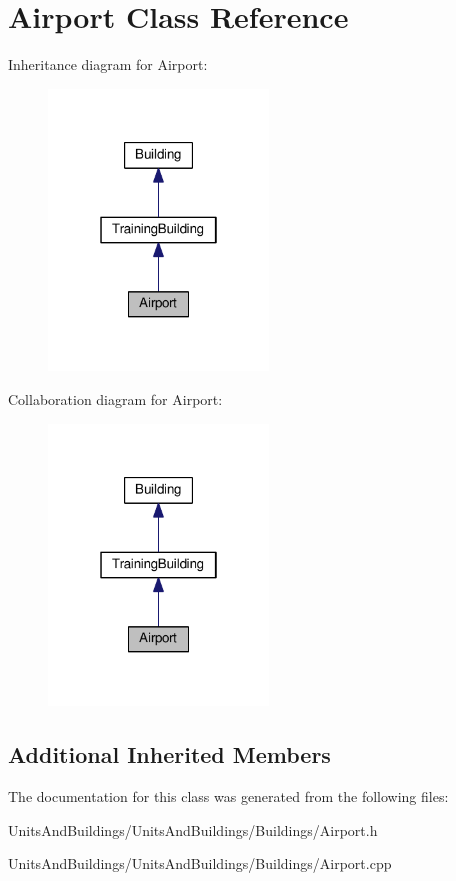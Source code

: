 \hypertarget{class_airport}{}\section{Airport Class Reference}
\label{class_airport}


Inheritance diagram for Airport\+:
\nopagebreak
\begin{figure}[H]
\begin{center}
\leavevmode
\includegraphics[width=166pt]{class_airport__inherit__graph}
\end{center}
\end{figure}


Collaboration diagram for Airport\+:
\nopagebreak
\begin{figure}[H]
\begin{center}
\leavevmode
\includegraphics[width=166pt]{class_airport__coll__graph}
\end{center}
\end{figure}
\subsection*{Additional Inherited Members}


The documentation for this class was generated from the following files\+:\begin{DoxyCompactItemize}
\item 
Units\+And\+Buildings/\+Units\+And\+Buildings/\+Buildings/Airport.\+h\item 
Units\+And\+Buildings/\+Units\+And\+Buildings/\+Buildings/Airport.\+cpp\end{DoxyCompactItemize}
